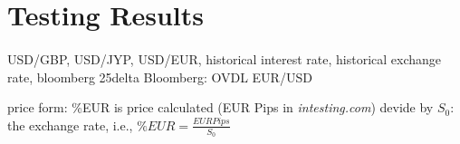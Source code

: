 \section{Testing Results}
\paragraph{}
USD/GBP, USD/JYP, USD/EUR, historical interest rate, historical exchange rate, bloomberg 25delta
Bloomberg: OVDL EUR/USD

price form: \%EUR is price calculated (EUR Pips in \textit{intesting.com}) devide by $S_0$: the exchange rate, i.e., $\%EUR=\frac{EUR Pips}{S_0}$


